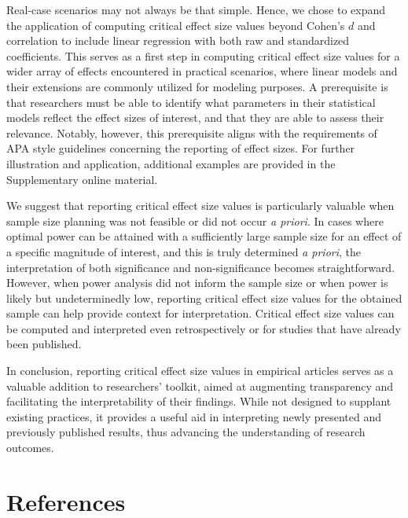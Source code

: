 \documentclass[
  man]{apa7}
\begin{document}
Real-case scenarios may not always be that simple. Hence, we chose to expand the application of computing critical effect size values beyond Cohen's \(d\) and correlation to include linear regression with both raw and standardized coefficients. This serves as a first step in computing critical effect size values for a wider array of effects encountered in practical scenarios, where linear models and their extensions are commonly utilized for modeling purposes. A prerequisite is that researchers must be able to identify what parameters in their statistical models reflect the effect sizes of interest, and that they are able to assess their relevance. Notably, however, this prerequisite aligns with the requirements of APA style guidelines concerning the reporting of effect sizes. For further illustration and application, additional examples are provided in the Supplementary online material.

We suggest that reporting critical effect size values is particularly valuable when sample size planning was not feasible or did not occur \textit{a priori}. In cases where optimal power can be attained with a sufficiently large sample size for an effect of a specific magnitude of interest, and this is truly determined \textit{a priori}, the interpretation of both significance and non-significance becomes straightforward. However, when power analysis did not inform the sample size or when power is likely but undeterminedly low, reporting critical effect size values for the obtained sample can help provide context for interpretation. Critical effect size values can be computed and interpreted even retrospectively or for studies that have already been published.

In conclusion, reporting critical effect size values in empirical articles serves as a valuable addition to researchers' toolkit, aimed at augmenting transparency and facilitating the interpretability of their findings. While not designed to supplant existing practices, it provides a useful aid in interpreting newly presented and previously published results, thus advancing the understanding of research outcomes.

\newpage

\hypertarget{references}{%
\section{References}\label{references}}
\end{document}

